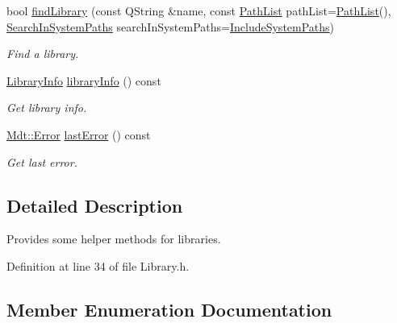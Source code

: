 \begin{DoxyCompactItemize}
\item 
bool \hyperlink{class_mdt_1_1_deploy_utils_1_1_library_afeac04ff3404387fc542347849bffeb4}{find\+Library} (const Q\+String \&name, const \hyperlink{class_mdt_1_1_deploy_utils_1_1_path_list}{Path\+List} path\+List=\hyperlink{class_mdt_1_1_deploy_utils_1_1_path_list}{Path\+List}(), \hyperlink{class_mdt_1_1_deploy_utils_1_1_library_ab9f58dba8290dd1882a21d73cc7c10d0}{Search\+In\+System\+Paths} search\+In\+System\+Paths=\hyperlink{class_mdt_1_1_deploy_utils_1_1_library_ab9f58dba8290dd1882a21d73cc7c10d0adabc8cd036aa884536c359cc3a2783ca}{Include\+System\+Paths})
\begin{DoxyCompactList}\small\item\em Find a library. \end{DoxyCompactList}\item 
\hyperlink{class_mdt_1_1_deploy_utils_1_1_library_info}{Library\+Info} \hyperlink{class_mdt_1_1_deploy_utils_1_1_library_a8b272e0c638aa2949b5f19b3c75ed9ae}{library\+Info} () const 
\begin{DoxyCompactList}\small\item\em Get library info. \end{DoxyCompactList}\item 
\hyperlink{class_mdt_1_1_error}{Mdt\+::\+Error} \hyperlink{class_mdt_1_1_deploy_utils_1_1_library_adb9bf35bba0d23731ac97d40fc5fe91d}{last\+Error} () const 
\begin{DoxyCompactList}\small\item\em Get last error. \end{DoxyCompactList}\end{DoxyCompactItemize}


\subsection{Detailed Description}
Provides some helper methods for libraries. 

Definition at line 34 of file Library.\+h.



\subsection{Member Enumeration Documentation}
